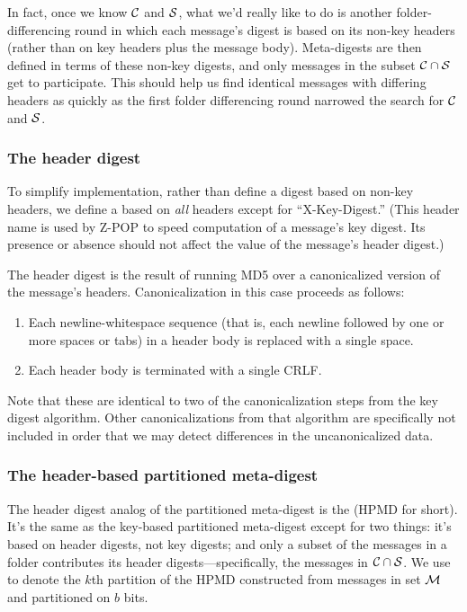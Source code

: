 In fact, once we know ${\cal C}$ and ${\cal S}$, what we'd
really like to do is another folder-differencing round in which each
message's digest is based on its non-key headers (rather than on key
headers plus the message body).  Meta-digests are then defined in
terms of these non-key digests, and only messages in the subset
${\cal C}\cap{\cal S}$ get to participate.  This should help us
find identical messages with differing headers as quickly as the first
folder differencing round narrowed the search for ${\cal C}$ and
${\cal S}$.

\subsubsection{The header digest}

To simplify implementation, rather than define a digest based on
non-key headers, we define a  based on \emph{all}
headers except for ``X-Key-Digest.''  (This header name is used by
Z-POP to speed computation of a message's key digest.  Its presence or
absence should not affect the value of the message's header digest.)

The header digest is the result of running MD5 over a canonicalized
version of the message's headers.  Canonicalization in this case
proceeds as follows:

\begin{enumerate}
\item
Each newline-whitespace sequence (that is, each newline followed by
one or more spaces or tabs) in a header body is replaced with a single
space.

\item
Each header body is terminated with a single CRLF.
\end{enumerate}

Note that these are identical to two of the canonicalization steps
from the key digest algorithm.  Other canonicalizations from that
algorithm are specifically not included in order that we may detect
differences in the uncanonicalized data.

\subsubsection{The header-based partitioned meta-digest}

The header digest analog of the partitioned meta-digest is the
 (HPMD for short).  It's the
same as the key-based partitioned meta-digest except for two things:
it's based on header digests, not key digests; and only a subset of
the messages in a folder contributes its header
digests---specifically, the messages in ${\cal C}\cap{\cal S}$.
We use  to denote the $k$th partition of the
HPMD constructed from messages in set ${\cal M}$ and partitioned on
$b$ bits.

